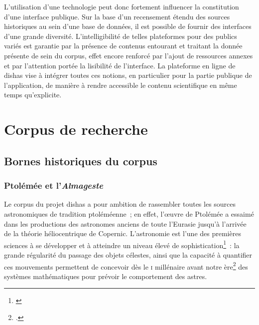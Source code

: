 \documentclass[a4paper,12pt,twoside]{book}
\newcommand{\clearemptydoublepage}{\newpage{\pagestyle{empty}\cleardoublepage}}
\newcommand{\I}{\textsc{i}\ieme{}\xspace}
\newcommand{\dishas}{\gls{dishas}\xspace}
\begin{document}
L'utilisation d'une technologie peut donc fortement influencer la constitution d'une interface publique. Sur la base d'un recensement étendu des sources historiques au sein d'une base de données, il est possible de fournir des interfaces d'une grande diversité. L'intelligibilité de telles plateformes pour des publics variés est garantie par la présence de contenus entourant et traitant la donnée présente de sein du corpus, effet encore renforcé par l'ajout de ressources annexes et par l'attention portée la lisibilité de l'interface. La plateforme en ligne de \dishas vise à intégrer toutes ces notions, en particulier pour la partie publique de l'application, de manière à rendre accessible le contenu scientifique en même temps qu'explicite.

\clearemptydoublepage

\chapter{Corpus de recherche}
	\section{Bornes historiques du corpus}
		\subsection{Ptolémée et l'\emph{Almageste}}
Le corpus du projet \dishas a pour ambition de rassembler toutes les sources astronomiques de tradition ptoléméenne~; en effet, l'œuvre de Ptolémée a essaimé dans les productions des astronomes anciens de toute l'Eurasie jusqu'à l'arrivée de la théorie héliocentrique de Copernic. L'astronomie est l'une des premières sciences à se développer et à atteindre un niveau élevé de sophistication\footnote{\cite{evansHistoryAstronomy}}~: la grande régularité du passage des objets célestes, ainsi que la capacité à quantifier ces mouvements permettent de concevoir dès le \I millénaire avant notre ère\footcite{evansHistoryAstronomy} des systèmes mathématiques pour prévoir le comportement des astres.\\
\end{document}
